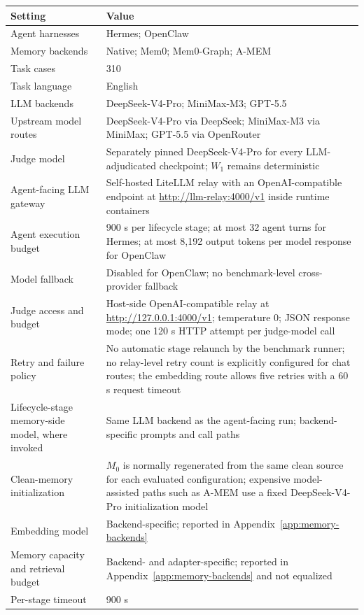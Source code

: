 \documentclass[letterpaper]{article}
\begin{document}
\setcounter{table}{4}
\begin{center}
\centering
\small
\setlength{\tabcolsep}{4pt}
\renewcommand{\arraystretch}{1.04}
\begin{tabular}{@{}p{}p{}@{}}
\toprule
\textbf{Setting} & \textbf{Value} \\
\midrule
Agent harnesses & Hermes; OpenClaw \\
Memory backends & Native; Mem0; Mem0-Graph; A-MEM \\
Task cases & 310 \\
Task language & English \\
LLM backends & DeepSeek-V4-Pro; MiniMax-M3; GPT-5.5 \\
Upstream model routes & DeepSeek-V4-Pro via DeepSeek; MiniMax-M3 via MiniMax; GPT-5.5 via OpenRouter \\
Judge model & Separately pinned DeepSeek-V4-Pro for every LLM-adjudicated checkpoint; \(W_1\) remains deterministic \\
Agent-facing LLM gateway & Self-hosted LiteLLM relay with an OpenAI-compatible endpoint at \url{http://llm-relay:4000/v1} inside runtime containers \\
Agent execution budget & 900 s per lifecycle stage; at most 32 agent turns for Hermes; at most 8,192 output tokens per model response for OpenClaw \\
Model fallback & Disabled for OpenClaw; no benchmark-level cross-provider fallback \\
Judge access and budget & Host-side OpenAI-compatible relay at \url{http://127.0.0.1:4000/v1}; temperature 0; JSON response mode; one 120 s HTTP attempt per judge-model call \\
Retry and failure policy & No automatic stage relaunch by the benchmark runner; no relay-level retry count is explicitly configured for chat routes; the embedding route allows five retries with a 60 s request timeout \\
Lifecycle-stage memory-side model, where invoked & Same LLM backend as the agent-facing run; backend-specific prompts and call paths \\
Clean-memory initialization & \(M_0\) is normally regenerated from the same clean source for each evaluated configuration; expensive model-assisted paths such as A-MEM use a fixed DeepSeek-V4-Pro initialization model \\
Embedding model & Backend-specific; reported in Appendix~\ref{app:memory-backends} \\
Memory capacity and retrieval budget & Backend- and adapter-specific; reported in Appendix~\ref{app:memory-backends} and not equalized \\
Per-stage timeout & 900 s \\
\bottomrule
\end{tabular}
\label{tab:runtime-settings}
\end{center}
\end{document}
